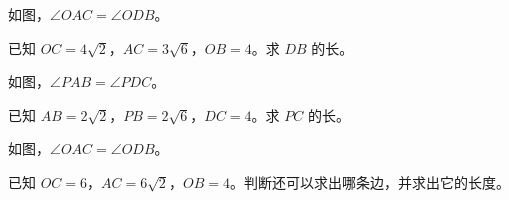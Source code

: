 \documentclass{exam-zh}
\begin{document}

\begin{problem}[points=10]
  \noindent
  \begin{minipage}[t]{\dimexpr\linewidth-60mm-6mm\relax}
    \vspace{0pt}
    如图，$\angle OAC=\angle ODB$。

已知 $OC=4\sqrt{2}$，$AC=3\sqrt{6}$，$OB=4$。求 $DB$ 的长。
    
  \end{minipage}\hfill
  \begin{diagramcoltikz}{60mm}{}
  }
  \end{diagramcoltikz}
  \par\medskip
  \answerarea[54mm]
\end{problem}



\begin{problem}[points=10]
  \noindent
  \begin{minipage}[t]{\dimexpr\linewidth-60mm-6mm\relax}
    \vspace{0pt}
    如图，$\angle PAB=\angle PDC$。

已知 $AB=2\sqrt{2}$，$PB=2\sqrt{6}$，$DC=4$。求 $PC$ 的长。
    
  \end{minipage}\hfill
  \begin{diagramcoltikz}{60mm}{}
  }
  \end{diagramcoltikz}
  \par\medskip
  \answerarea[54mm]
\end{problem}



\begin{problem}[points=10]
  \noindent
  \begin{minipage}[t]{\dimexpr\linewidth-60mm-6mm\relax}
    \vspace{0pt}
    如图，$\angle OAC=\angle ODB$。

已知 $OC=6$，$AC=6\sqrt{2}$，$OB=4$。判断还可以求出哪条边，并求出它的长度。
    
  \end{minipage}\hfill
  \begin{diagramcoltikz}{60mm}{}
  }
  \end{diagramcoltikz}
  \par\medskip
  \answerarea[54mm]
\end{problem}
\end{document}
